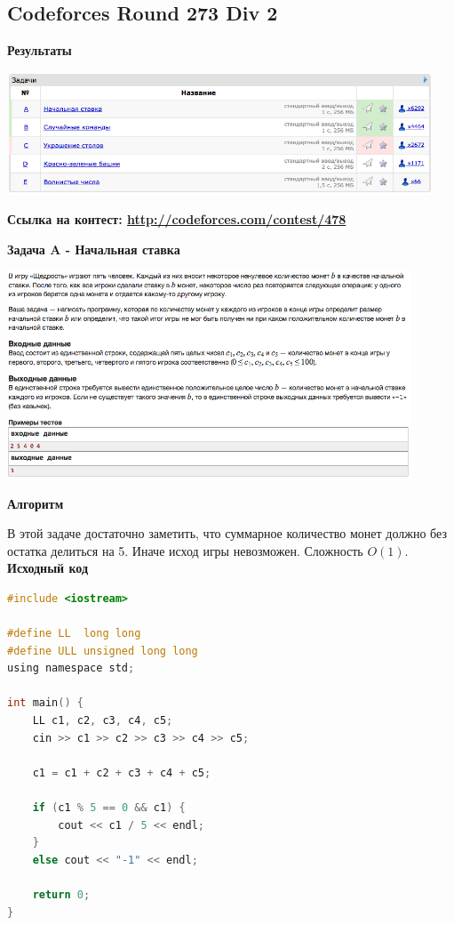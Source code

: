 \documentclass[a4paper,12pt]{article}
\begin{document}
%
%

\newpage
\subsection{Codeforces Round 273 Div 2}

\textbf{{\large Результаты}} \\
\begin{center}
\includegraphics[width=0.95\textwidth]{C_273/C_273_result.png}\\ [1cm]
\end{center}

\textbf{{\large Ссылка на контест: \url{http://codeforces.com/contest/478}}}

\newpage
\textbf{{\large Задача A - Начальная ставка}}

\begin{center}
\includegraphics[width=0.9\textwidth]{C_273/C_273_A.png}\\ [1cm]
\end{center}

\textbf{{\large Алгоритм}}

В этой задаче достаточно заметить, что суммарное количество монет должно без остатка делиться на 5. Иначе исход игры невозможен. Сложность $O(1)$.\\

\textbf{{\large Исходный код}} \\
\begin{lstlisting}[language=C]
#include <iostream>

#define LL  long long
#define ULL unsigned long long
using namespace std;

int main() {
    LL c1, c2, c3, c4, c5;
    cin >> c1 >> c2 >> c3 >> c4 >> c5;

    c1 = c1 + c2 + c3 + c4 + c5;

    if (c1 % 5 == 0 && c1) {
        cout << c1 / 5 << endl;
    }
    else cout << "-1" << endl;

    return 0;
}
\end{lstlisting}
\end{document}
